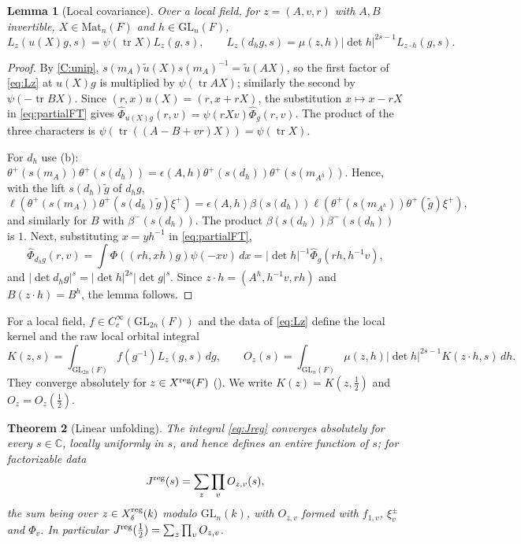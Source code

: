 \documentclass[11pt,oneside,notitlepage]{book}
\numberwithin{equation}{section}
\theoremstyle{plain}
\newtheorem{theorem}{Theorem}[section]
\newtheorem{lemma}[theorem]{Lemma}
\theoremstyle{definition}
\newcommand{\C}{\mathbb{C}}
\newcommand{\GL}{\mathrm{GL}}
\newcommand{\Mat}{\mathrm{Mat}}
\newcommand{\tr}{\operatorname{tr}}
\begin{document}
\begin{lemma}[Local covariance]\label{lem:covariance}
Over a local field, for $z=(A,v,r)$ with $A,B$ invertible, $X\in\Mat_n(F)$ and $h\in\GL_n(F)$,
\[L_z(u(X)g,s)=\psi(\tr X)L_z(g,s),\qquad L_z(d_hg,s)=\mu(z,h)|\det h|^{2s-1}L_{z\cdot h}(g,s).\]
\end{lemma}
\begin{proof}
By \ref{C:unip}, $s(m_A)\tilde u(X)s(m_A)^{-1}=\tilde u(AX)$, so the first factor of \eqref{eq:Lz} at $u(X)g$ is multiplied by $\psi(\tr AX)$; similarly the second by $\psi(-\tr BX)$. Since $(r,x)u(X)=(r,x+rX)$, the substitution $x\mapsto x-rX$ in \eqref{eq:partialFT} gives $\widehat\Phi_{u(X)g}(r,v)=\psi(rXv)\widehat\Phi_g(r,v)$. The product of the three characters is $\psi(\tr((A-B+vr)X))=\psi(\tr X)$.

For $d_h$ use (b): $\theta^+(s(m_A))\theta^+(s(d_h))=\epsilon(A,h)\theta^+(s(d_h))\theta^+(s(m_{A^h}))$. Hence, with the lift $s(d_h)\tilde g$ of $d_hg$,
\[\ell(\theta^+(s(m_A))\theta^+(s(d_h)\tilde g)\xi^+)=\epsilon(A,h)\beta(s(d_h))\ell(\theta^+(s(m_{A^h}))\theta^+(\tilde g)\xi^+),\]
and similarly for $B$ with $\beta^-(s(d_h))$. The product $\beta(s(d_h))\beta^-(s(d_h))$ is $1$. Next, substituting $x=yh^{-1}$ in \eqref{eq:partialFT},
\[\widehat\Phi_{d_hg}(r,v)=\int\Phi((rh,xh)g)\psi(-xv)\,dx=|\det h|^{-1}\widehat\Phi_g(rh,h^{-1}v),\]
and $|\det d_hg|^s=|\det h|^{2s}|\det g|^s$. Since $z\cdot h=(A^h,h^{-1}v,rh)$ and $B(z\cdot h)=B^h$, the lemma follows.
\end{proof}

For a local field, $f\in C_c^\infty(\GL_{2n}(F))$ and the data of \eqref{eq:Lz} define the local kernel and the raw local orbital integral
\begin{equation}\label{eq:rawOI}
K(z,s)=\int_{\GL_{2n}(F)}f(g^{-1})L_z(g,s)\,dg,\qquad O_z(s)=\int_{\GL_n(F)}\mu(z,h)|\det h|^{2s-1}K(z\cdot h,s)\,dh .
\end{equation}
They converge absolutely for $z\in X^{\rm reg}(F)$ (). We write $K(z)=K(z,\frac12)$ and $O_z=O_z(\frac12)$.

\begin{theorem}[Linear unfolding]\label{thm:linear-unfold}
The integral \eqref{eq:Jreg} converges absolutely for every $s\in\C$, locally uniformly in $s$, and hence defines an entire function of $s$; for factorizable data
\[J^{\rm reg}(s)=\sum_{z}\prod_vO_{z,v}(s),\]
the sum being over $z\in X_\delta^{\rm reg}(k)$ modulo $\GL_n(k)$, with $O_{z,v}$ formed with $f_{1,v}$, $\xi^\pm_v$ and $\Phi_v$. In particular $J^{\rm reg}(\frac12)=\sum_z\prod_vO_{z,v}$.
\end{theorem}
\end{document}
